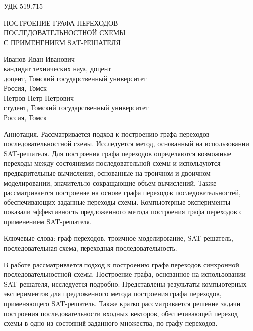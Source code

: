 \documentclass[a4paper,12pt]{article}
\begin{document}
\noindent УДК 519.715

\vspace{0.2cm}

\begin{center}
{\LARGE ПОСТРОЕНИЕ ГРАФА ПЕРЕХОДОВ}\\
\vspace{0.15cm}
{\LARGE ПОСЛЕДОВАТЕЛЬНОСТНОЙ СХЕМЫ}\\
\vspace{0.15cm}
{\LARGE С ПРИМЕНЕНИЕМ SAT-РЕШАТЕЛЯ}
\end{center}

\begin{center}
Иванов Иван Иванович\\
кандидат технических наук, доцент\\
доцент, Томский государственный университет\\
Россия, Томск\\
Петров Петр Петрович\\
студент, Томский государственный университет\\
Россия, Томск
\end{center}

Аннотация. Рассматривается подход к построению графа переходов последовательностной схемы. Исследуется метод, основанный на использовании SAT-решателя. Для построения графа переходов определяются возможные переходы между состояниями последовательной схемы и используются предварительные вычисления, основанные на троичном и двоичном моделировании, значительно сокращающие объем вычислений. Также рассматривается построение на основе графа переходов последовательностей, обеспечивающих заданные переходы схемы. Компьютерные эксперименты показали эффективность предложенного метода построения графа переходов с применением SAT-решателя.

Ключевые слова: граф переходов, троичное моделирование, SAT-решатель, последовательная схема, переходная последовательность.

\vspace{0,5cm}

В работе рассматривается подход к построению графа переходов синхронной последовательностной схемы. Построение графа, основанное на использовании SAT-решателя, исследуется подробно. Представлены результаты компьютерных экспериментов для предложенного метода построения графа переходов, применяющего SAT-решатель. Также кратко рассматривается решение задачи построения последовательности входных векторов, обеспечивающей переход схемы в одно из состояний заданного множества, по графу переходов.
\end{document}
